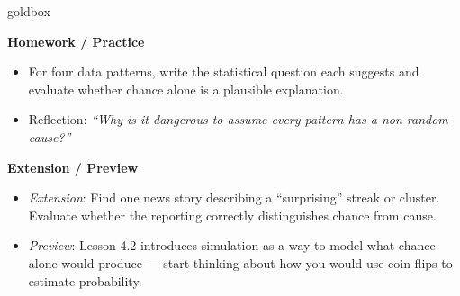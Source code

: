 \documentclass[10pt]{article}
\begin{document}
\begin{skillbox}{goldbox}
\begin{minipage}[t]{0.48\linewidth}
    \textbf{Homework / Practice}
    \begin{itemize}
        \item For four data patterns, write the statistical question each suggests and
              evaluate whether chance alone is a plausible explanation.
        \item Reflection: \textit{``Why is it dangerous to assume every pattern has a
              non-random cause?''}
    \end{itemize}
\end{minipage}
\hfill
\begin{minipage}[t]{0.48\linewidth}
    \textbf{Extension / Preview}
    \begin{itemize}
        \item \textit{Extension}: Find one news story describing a ``surprising'' streak
              or cluster. Evaluate whether the reporting correctly distinguishes chance
              from cause.
        \item \textit{Preview}: Lesson 4.2 introduces simulation as a way to model what
              chance alone would produce --- start thinking about how you would use coin
              flips to estimate probability.
    \end{itemize}
\end{minipage}
\end{skillbox}
\end{document}
